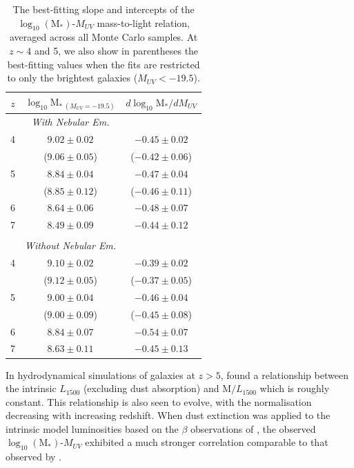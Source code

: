 \begin{table}
\caption{The best-fitting slope and intercepts of the $\log_{10} (\text{M}_{*})$-$M_{UV}$ mass-to-light relation, averaged across all Monte Carlo samples. At $z\sim 4$ and 5, we also show in parentheses the best-fitting values when the fits are restricted to only the brightest galaxies ($M_{UV} < -19.5$).}
\centering
\begin{tabular}{c c c}
\hline
$z$ & $\log_{10}\text{M}_{*~(M_{UV}=-19.5)}$ & $d\log_{10}\text{M}_{*}/dM_{UV}$ \\ 
\hline
 & \emph{With Nebular Em.} & \\
4 & $9.02 \pm 0.02$ & $-0.45\pm 0.02$ \\
  & ($9.06 \pm 0.05$) &  ($-0.42 \pm 0.06$) \\
5 & $8.84 \pm 0.04$ & $-0.47\pm 0.04$ \\
  & ($8.85 \pm 0.12$) &  ($-0.46 \pm 0.11$) \\
6 & $8.64 \pm 0.06$ & $-0.48\pm 0.07$ \\
7 & $8.49 \pm 0.09$ & $-0.44\pm 0.12$ \\
 & & \\
 & \emph{Without Nebular Em.} & \\
4 & $9.10 \pm 0.02$ & $-0.39\pm 0.02$ \\
  & ($9.12 \pm 0.05$) &  ($-0.37 \pm 0.05$) \\
5 & $9.00 \pm 0.04$ & $-0.46\pm 0.04$ \\
  & ($9.00 \pm 0.09$) &  ($-0.45 \pm 0.08$) \\
6 & $8.84 \pm 0.07$ & $-0.54\pm 0.07$ \\
7 & $8.63 \pm 0.11$ & $-0.45\pm 0.13$ \\ 

\hline
\end{tabular}
\label{tab:ML}
\end{table}

In hydrodynamical simulations of galaxies at $z > 5$, \citet{Wilkins:2013kh} found a relationship between the intrinsic $L_{1500}$ (excluding dust absorption) and $\text{M}/L_{1500}$ which is roughly constant. This relationship is also seen to evolve, with the normalisation decreasing with increasing redshift. When dust extinction was applied to the intrinsic model luminosities based on the $\beta$ observations of \citet{2012ApJ...754...83B}, the observed $\log_{10} (\text{M}_{*})$-$M_{UV}$ exhibited a much stronger correlation comparable to that observed by \citet{Gonzalez:2011dn}.


